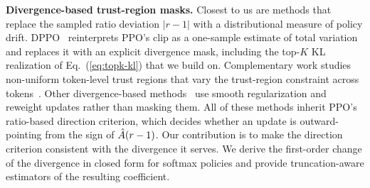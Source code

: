 \noindent\textbf{Divergence-based trust-region masks.}
Closest to us are methods that replace the sampled ratio deviation $|r-1|$ with a
distributional measure of policy drift. DPPO~\citep{dppo} reinterprets PPO's clip
as a one-sample estimate of total variation and replaces it with an explicit
divergence mask, including the top-$K$ KL realization of Eq.~(\ref{eq:topk-kl})
that we build on.
Complementary work studies non-uniform token-level trust regions that vary the
trust-region constraint across tokens~\citep{mao2026beyond}.
Other divergence-based methods~\citep{r2vpo,yao2026rethinking} use smooth
regularization and reweight updates rather than masking them. All of these
methods inherit PPO's ratio-based direction criterion, which decides whether an
update is outward-pointing from the sign of $\hat{A}(r-1)$. Our contribution is to
make the direction criterion consistent with the divergence it serves.
We derive the first-order change of the divergence in closed form for softmax
policies and provide truncation-aware estimators of the resulting coefficient.

